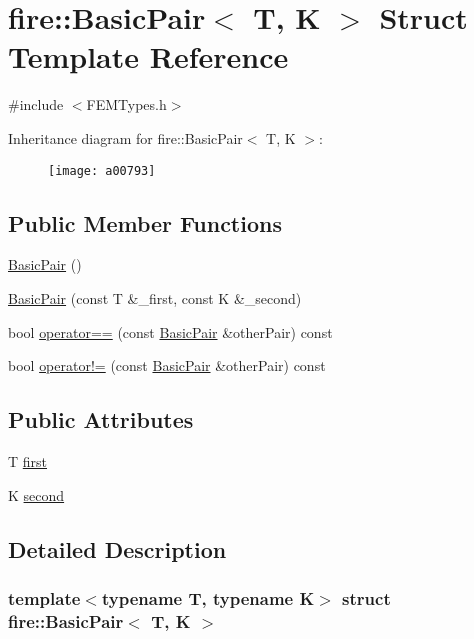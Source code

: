 \hypertarget{a00793}{}\section{fire\+:\+:Basic\+Pair$<$ T, K $>$ Struct Template Reference}
\label{a00793}


{\ttfamily \#include $<$F\+E\+M\+Types.\+h$>$}

Inheritance diagram for fire\+:\+:Basic\+Pair$<$ T, K $>$\+:\begin{figure}[H]
\begin{center}
\leavevmode
\texttt{[image: a00793]}
\end{center}
\end{figure}
\subsection*{Public Member Functions}
\begin{DoxyCompactItemize}
\item 
\hyperlink{a00793_a28eae46234d49126ac4727e7883174a4}{Basic\+Pair} ()
\item 
\hyperlink{a00793_ada8fa3f47bae245613d050598ac8488c}{Basic\+Pair} (const T \&\+\_\+first, const K \&\+\_\+second)
\item 
bool \hyperlink{a00793_acf9bd93b4bf7e16ca730a4dcc3ab859d}{operator==} (const \hyperlink{a00793}{Basic\+Pair} \&other\+Pair) const
\item 
bool \hyperlink{a00793_a8cff50c2cbaaa51cba83832d435455d7}{operator!=} (const \hyperlink{a00793}{Basic\+Pair} \&other\+Pair) const
\end{DoxyCompactItemize}
\subsection*{Public Attributes}
\begin{DoxyCompactItemize}
\item 
T \hyperlink{a00793_a4e073a19bf2d3330d105d81a8febc4be}{first}
\item 
K \hyperlink{a00793_aecd2977e2fb903a5b106e4b5d7ab3bac}{second}
\end{DoxyCompactItemize}


\subsection{Detailed Description}
\subsubsection*{template$<$typename T, typename K$>$\newline
struct fire\+::\+Basic\+Pair$<$ T, K $>$}

